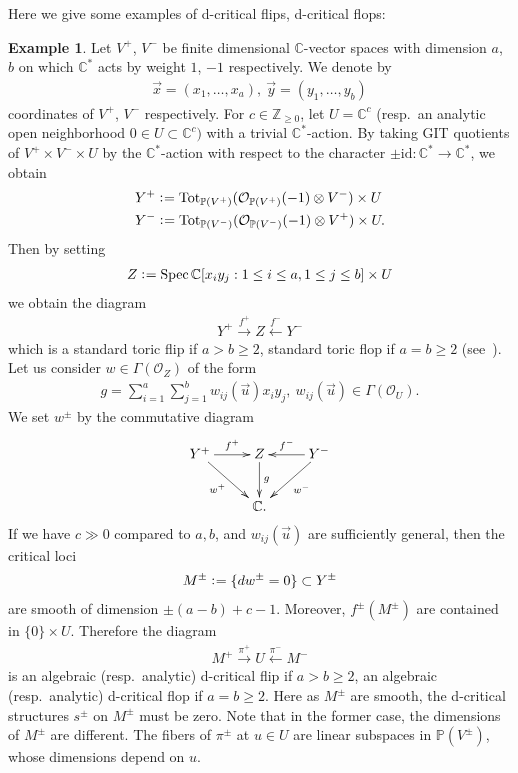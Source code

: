 \documentclass[11pt]{amsart}
\theoremstyle{plain}
\theoremstyle{definition}
\newtheorem{exam}[thm]{Example}
\theoremstyle{remark}
\newcommand{\oO}{\mathcal{O}}
\newcommand{\id}{\textrm{id}}
\newcommand{\Spec}{\mathop{\rm Spec}\nolimits}
\begin{document}
Here we give some examples of 
d-critical flips, d-critical flops: 
\begin{exam}\label{exam:toric}
Let $V^{+}$, $V^-$ be finite dimensional $\mathbb{C}$-vector spaces 
with dimension $a$, $b$ on which 
$\mathbb{C}^{\ast}$ acts by weight $1$, $-1$ respectively. 
We denote by 
\begin{align*}
\vec{x}=(x_1, \ldots, x_a), \ 
\vec{y}=(y_1, \ldots, y_{b})
\end{align*}
coordinates of $V^+$, $V^-$ respectively. 
For $c \in \mathbb{Z}_{\ge 0}$, let 
$U=\mathbb{C}^c$ (resp.~an analytic open neighborhood 
$0 \in U \subset \mathbb{C}^c)$
with a trivial $\mathbb{C}^{\ast}$-action. 
By taking GIT quotients of 
$V^+ \times V^{-} \times U$ by the 
$\mathbb{C}^{\ast}$-action with respect to the 
character $\pm \id \colon \mathbb{C}^{\ast} \to \mathbb{C}^{\ast}$, 
we obtain
\begin{align*}
&Y^+ \cneq \mathrm{Tot}_{\mathbb{P}(V^+)}(\oO_{\mathbb{P}(V^+)}(-1) \otimes V^-) \times U \\
&Y^- \cneq \mathrm{Tot}_{\mathbb{P}(V^-)}(\oO_{\mathbb{P}(V^-)}(-1) \otimes V^+) \times U.
\end{align*}
Then by setting
\begin{align*}
Z \cneq \Spec \mathbb{C}[x_i y_j : 1\le i \le a, 1\le j\le b] \times U
\end{align*}
we obtain the diagram
\begin{align}\label{dia:toricflip}
Y^{+} \stackrel{f^+}{\to} Z \stackrel{f^-}{\leftarrow} Y^-
\end{align}
which is a standard toric flip if 
$a>b\ge 2$, 
standard toric flop if $a=b \ge 2$
(see~\cite{Rei92}). 
Let us consider $w \in \Gamma(\oO_Z)$ of the form
\begin{align*}
g=\sum_{i=1}^a \sum_{j=1}^b w_{ij}(\vec{u}) x_i y_j, \ 
w_{ij}(\vec{u}) \in \Gamma(\oO_U). 
\end{align*}
We set $w^{\pm}$ by the commutative diagram
\begin{align*}
\xymatrix{
Y^{+} \ar[r]^-{f^{+}} \ar[rd]_-{w^+} 
& Z \ar[d]^-{g} &
\ar[l]_-{f^-} Y^- \ar[ld]^-{w^-}\\
& \mathbb{C}. &
}
\end{align*}
If we have $c \gg 0$ compared to $a, b$, and 
$w_{ij}(\vec{u})$ are sufficiently general, 
then the critical loci
\begin{align}\label{M:pm}
M^{\pm} \cneq \{dw^{\pm}=0\} \subset Y^{\pm}
\end{align}
are smooth of dimension $\pm (a-b)+c-1$. 
Moreover, $f^{\pm}(M^{\pm})$ are contained in 
$\{0\} \times U$. Therefore the diagram
\begin{align}\label{dia:ab2}
M^+ \stackrel{\pi^+}{\to} U \stackrel{\pi^-}{\leftarrow} M^-
\end{align}
is an algebraic (resp.~analytic) d-critical flip if $a>b\ge 2$, 
an algebraic (resp.~analytic) d-critical flop if $a=b \ge 2$. 
Here as $M^{\pm}$ are smooth, the d-critical 
structures $s^{\pm}$ on $M^{\pm}$ must be zero. 
Note that in the former case, the dimensions 
of $M^{\pm}$ are different. 
The fibers of $\pi^{\pm}$ at $u \in U$ are linear subspaces in 
$\mathbb{P}(V^{\pm})$, whose dimensions depend on $u$. 
\end{exam}
\end{document}
